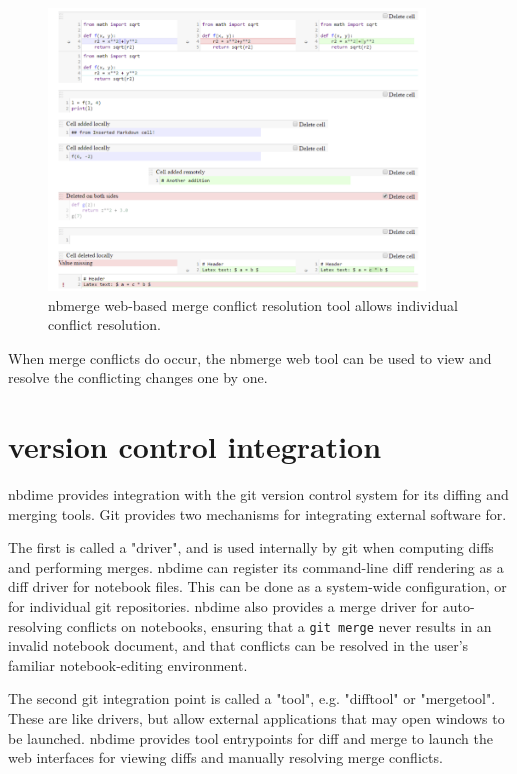 \documentclass{../../Proposal/Latex-Proposal/deliverablereport}
\begin{document}
\begin{figure}
    \center
    \includegraphics[width=10cm]{img/nbmerge-web}
    \caption{nbmerge web-based merge conflict resolution tool allows individual conflict resolution.}
    \label{fig:nbmerge-web}
\end{figure}

When merge conflicts do occur, the nbmerge web tool can be used to view and resolve the conflicting changes one by one.



\section{version control integration} %
\label{sub:version_control_integration}

nbdime provides integration with the git version control system for its diffing and merging tools.
Git provides two mechanisms for integrating external software for.

The first is called a "driver", and is used internally by git when computing diffs and performing merges. nbdime can register its command-line diff rendering as a diff driver for notebook files.
This can be done as a system-wide configuration, or for individual git repositories.
nbdime also provides a merge driver for auto-resolving conflicts on notebooks,
ensuring that a \texttt{git merge} never results in an invalid notebook document,
and that conflicts can be resolved in the user's familiar notebook-editing environment.

The second git integration point is called a "tool", e.g. "difftool" or "mergetool".
These are like drivers, but allow external applications that may open windows to be launched.
nbdime provides tool entrypoints for diff and merge to launch the web interfaces for viewing diffs
and manually resolving merge conflicts.
\end{document}
